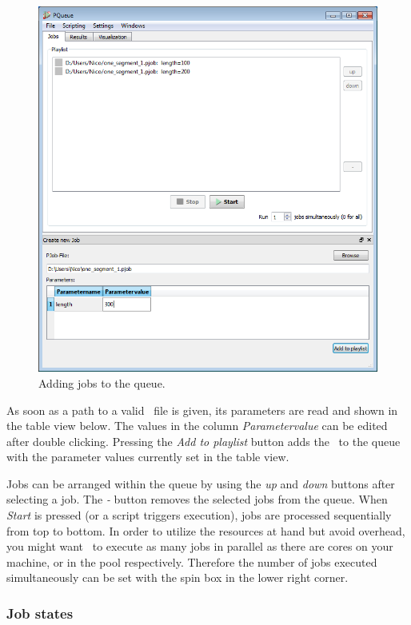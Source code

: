 \begin{figure}[!ht]
\includegraphics[width=\textwidth]{Screenshots/PQueue/adding_jobs.png}
\caption{Adding jobs to the queue.}
\label{pqueue:adding_jobs}
\end{figure}

As soon as a path to a valid \PJOB\ file is given,
its parameters are read and shown in the table view below.
The values in the column \textit{Parametervalue} can be edited after double clicking.
Pressing the \textit{Add to playlist} button adds the \PJOB\ to the queue with the parameter values currently set in the table view.\bb


Jobs can be arranged within the queue by using the \textit{up} and \textit{down} buttons after selecting a job.
The \textit{-} button removes the selected jobs from the queue.
When \textit{Start} is pressed (or a script triggers execution),
jobs are processed sequentially from top to bottom.
In order to utilize the resources at hand
but avoid overhead,
you might want \PQUEUE\ to execute as many jobs in parallel as there are cores on your machine,
or in the pool respectively.
Therefore the number of jobs executed simultaneously can be set with the spin box in the lower right corner.

\subsubsection{Job states}

